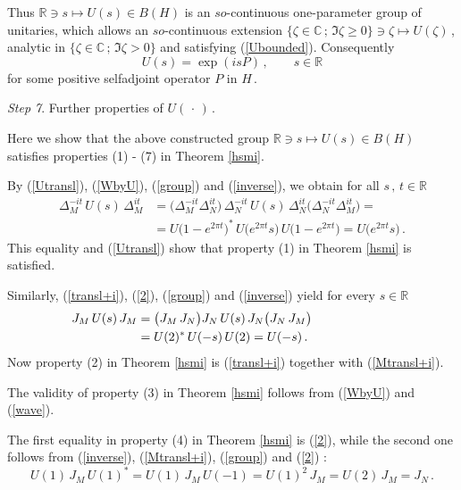 \documentclass[reqno]{amsart}
\theoremstyle{definition}
\theoremstyle{remark}
\numberwithin{equation}{section}
\theoremstyle{plain}
\begin{document}
Thus $\mathbb R\ni s\longmapsto U(s)\in B(H)$ is an $so$-continuous
one-parameter group of unitaries, which allows an $so$-continuous
extension $\{\zeta\in\mathbb C\, ;\,\Im \zeta\geq 0\}\ni\zeta
\longmapsto U(\zeta )\,$,
analytic in $\{\zeta\in\mathbb C\, ;\,\Im \zeta >0\}$ and
satisfying (\ref{Ubounded}). Consequently
\begin{equation}\label{P}
U(s) =\exp (i s P)\, ,\qquad s\in \mathbb R
\end{equation}
for some positive selfadjoint operator $P$ in $H\,$.
\bigskip

{\it Step 7}. {\sc Further properties of $U(\,\cdot\, )\,$.}
\medskip

Here we show that the above constructed group $\mathbb R\ni s
\longmapsto U(s)\in B(H)$ satisfies properties (1) - (7) in
Theorem \ref{hsmi}.

By (\ref{Utransl}), (\ref{WbyU}), (\ref{group}) and (\ref{inverse}),
we obtain for all $s\, ,\, t\in\mathbb R$
\begin{equation}\label{Utransl.bis}
\begin{split}
\Delta_M^{-it}\, U(s)\,\Delta_M^{it} &=
\big( \Delta_M^{-it} \Delta_N^{it}\big)\,\Delta_N^{-it}\, U(s)\,
\Delta_N^{it}\big( \Delta_N^{-it} \Delta_M^{it}\big) = \\
&=U\big( 1-e^{2 \pi t}\big)^{\! *}\, U\big( e^{2 \pi t} s\big)\,
U\big( 1-e^{2 \pi t}\big) =U\big( e^{2 \pi t} s\big)\, .
\end{split}
\end{equation}
This equality and (\ref{Utransl}) show that property (1) in
Theorem \ref{hsmi} is satisfied.

Similarly, (\ref{transl+i}), (\ref{2}), (\ref{group}) and
(\ref{inverse}) yield for every $s\in\mathbb R$
\begin{equation}\label{Mtransl+i}
\begin{split}
J_M\, U(s)\, J_M &=\big( J_M\, J_N\big) J_N\, U(s)\, J_N\big(
J_N\, J_M\big) \\
&=U(2)^*\, U(-s)\, U(2) =U(-s)\, . \hspace{2.4 cm}
\end{split}
\end{equation}
Now property (2) in Theorem \ref{hsmi} is (\ref{transl+i}) together
with (\ref{Mtransl+i}).

The validity of property (3) in Theorem \ref{hsmi} follows from
(\ref{WbyU}) and (\ref{wave}).

The first equality in property (4) in Theorem \ref{hsmi} is
(\ref{2}), while the second one follows from (\ref{inverse}),
(\ref{Mtransl+i}), (\ref{group}) and (\ref{2}) :
\begin{equation}\label{1}
U(1)\, J_M\, U(1)^* =U(1)\, J_M\, U(-1) =U(1)^2\, J_M =U(2)\, J_M
=J_N\, .
\end{equation}
\end{document}
